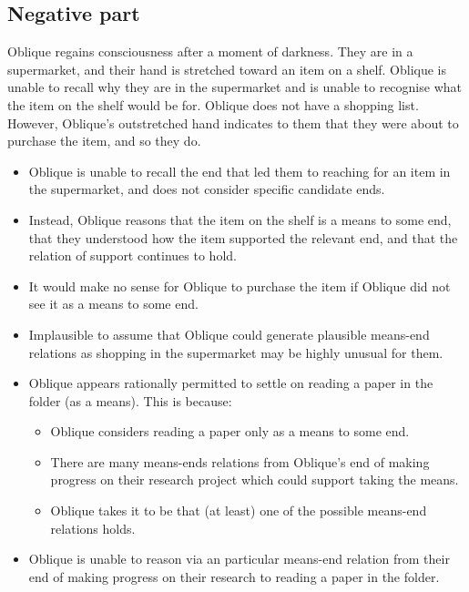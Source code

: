 \documentclass[10pt]{article}
\newcommand{\hozlinedash}[0]{%
  \noindent\hdashrule[0.5ex][c]{\textwidth}{.1pt}{2.5pt}
}
\begin{document}
\newpage


\subsection{Negative part}
\label{sec:negative-part}



\hozlinedash

\begin{scenario}[Supermarket]
  Oblique regains consciousness after a moment of darkness.
  They are in a supermarket, and their hand is stretched toward an item on a shelf.
  Oblique is unable to recall why they are in the supermarket and is unable to recognise what the item on the shelf would be for.
  Oblique does not have a shopping list.
  However, Oblique's outstretched hand indicates to them that they were about to purchase the item, and so they do.
\end{scenario}


\begin{itemize}
\item Oblique is unable to recall the end that led them to reaching for an item in the supermarket, and does not consider specific candidate ends.
\item Instead, Oblique reasons that the item on the shelf is a means to some end, that they understood how the item supported the relevant end, and that the relation of support continues to hold.
\item It would make no sense for Oblique to purchase the item if Oblique did not see it as a means to some end.
\item Implausible to assume that Oblique could generate plausible means-end relations as shopping in the supermarket may be highly unusual for them.
\end{itemize}




\hozlinedash

\begin{itemize}
\item Oblique appears rationally permitted to settle on reading a paper in the folder (as a means).
  This is because:
  \begin{itemize}
  \item Oblique considers reading a paper only as a means to some end.
  \item There are many means-ends relations from Oblique's end of making progress on their research project which could support taking the means.
  \item Oblique takes it to be that (at least) one of the possible means-end relations holds.
  \end{itemize}
\item Oblique is unable to reason via an particular means-end relation from their end of making progress on their research to reading a paper in the folder.
\end{itemize}
\end{document}
